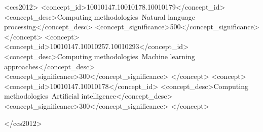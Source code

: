 \documentclass[sigconf,authorversion,nonacm]{acmart}
\begin{document}

\begin{CCSXML}
<ccs2012>
<concept_id>10010147.10010178.10010179</concept_id>
<concept_desc>Computing methodologies~Natural language processing</concept_desc>
<concept_significance>500</concept_significance>
</concept>
<concept>
<concept_id>10010147.10010257.10010293</concept_id>
<concept_desc>Computing methodologies~Machine learning approaches</concept_desc>
<concept_significance>300</concept_significance>
</concept>
<concept>
<concept_id>10010147.10010178</concept_id>
<concept_desc>Computing methodologies~Artificial intelligence</concept_desc>
<concept_significance>300</concept_significance>
</concept>

</ccs2012>
\end{CCSXML}





\maketitle

\end{document}
